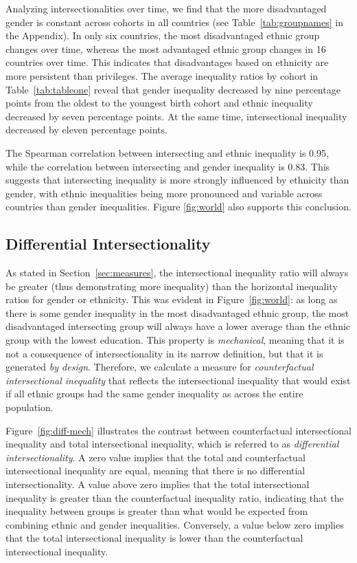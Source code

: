 Analyzing intersectionalities over time, we find that the more disadvantaged gender is constant across cohorts in all countries (see Table~\ref{tab:groupnames} in the Appendix). In only six countries, the most disadvantaged ethnic group changes over time, whereas the most advantaged ethnic group changes in 16 countries over time. This indicates that disadvantages based on ethnicity are more persistent than privileges. The average inequality ratios by cohort in Table~\ref{tab:tableone} reveal that gender inequality decreased by nine percentage points from the oldest to the youngest birth cohort and ethnic inequality decreased by seven percentage points. At the same time, intersectional inequality decreased by eleven percentage points. 

The Spearman correlation between intersecting and ethnic inequality is 0.95, while the correlation between intersecting and gender inequality is 0.83. This suggests that intersecting inequality is more strongly influenced by ethnicity than gender, with ethnic inequalities being more pronounced and variable across countries than gender inequalities. Figure \ref{fig:world} also supports this conclusion.

\hypertarget{differential-intersectionality}{%
\subsection{Differential Intersectionality}\label{differential-intersectionality}}

As stated in Section~\ref{sec:measures}, the intersectional inequality ratio will always be greater (thus demonstrating more inequality) than the horizontal inequality ratios for gender or ethnicity. This was evident in Figure~\ref{fig:world}: as long as there is some gender inequality in the most disadvantaged ethnic group, the most disadvantaged intersecting group will always have a lower average than the ethnic group with the lowest education. This property is \emph{mechanical}, meaning that it is not a consequence of intersectionality in its narrow definition, but that it is generated \textit{by design}. Therefore, we calculate a measure for \emph{counterfactual intersectional inequality} that reflects the intersectional inequality that would exist if all ethnic groups had the same gender inequality as across the entire population.

Figure~\ref{fig:diff-mech} illustrates the contrast between counterfactual intersectional inequality and total intersectional inequality, which is referred to as \emph{differential intersectionality}. A zero value implies that the total and counterfactual intersectional inequality are equal, meaning that there is no differential intersectionality. A value above zero implies that the total intersectional inequality is greater than the counterfactual inequality ratio, indicating that the inequality between groups is greater than what would be expected from combining ethnic and gender inequalities. Conversely, a value below zero implies that the total intersectional inequality is lower than the counterfactual intersectional inequality.

